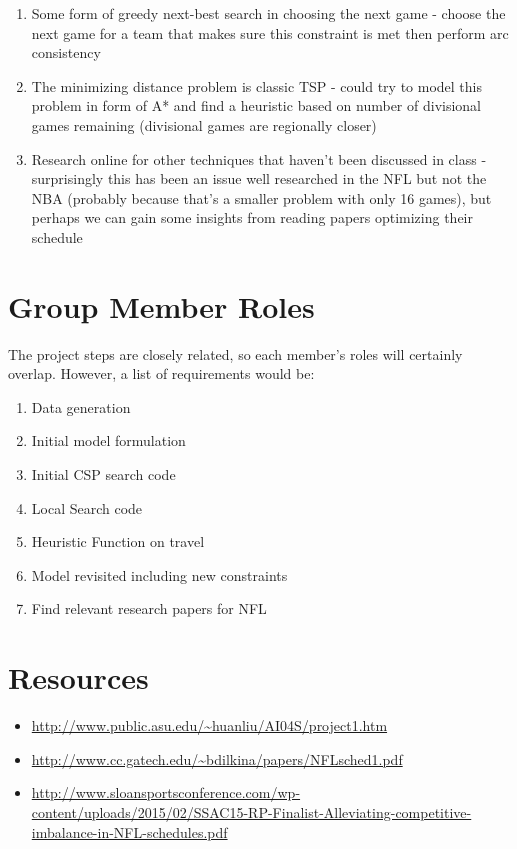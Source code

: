 \documentclass{article}
\begin{document}
	\begin{enumerate}
		\item Some form of greedy next-best search in choosing the next game - choose the next game for a team that makes sure this constraint is met then perform arc consistency
		\item The minimizing distance problem is classic TSP - could try to model this problem in form of A* and find a heuristic based on number of divisional games remaining (divisional games are regionally closer)
		\item Research online for other techniques that haven't been discussed in class - surprisingly this has been an issue well researched in the NFL but not the NBA (probably because that's a smaller problem with only 16 games), but perhaps we can gain some insights from reading papers optimizing their schedule
	\end{enumerate}

	\section{Group Member Roles}
	The project steps are closely related, so each member's roles will certainly overlap. However, a list of requirements would be:

	\begin{enumerate}
		\item Data generation
		\item Initial model formulation
		\item Initial CSP search code
		\item Local Search code
		\item Heuristic Function on travel
		\item Model revisited including new constraints
		\item Find relevant research papers for NFL
	\end{enumerate}

	\section{Resources}
	\begin{itemize}
		\item \url{http://www.public.asu.edu/~huanliu/AI04S/project1.htm}
		\item \url{http://www.cc.gatech.edu/~bdilkina/papers/NFLsched1.pdf}
		\item \url{http://www.sloansportsconference.com/wp-content/uploads/2015/02/SSAC15-RP-Finalist-Alleviating-competitive-imbalance-in-NFL-schedules.pdf}
	\end{itemize}
	
\end{document}
